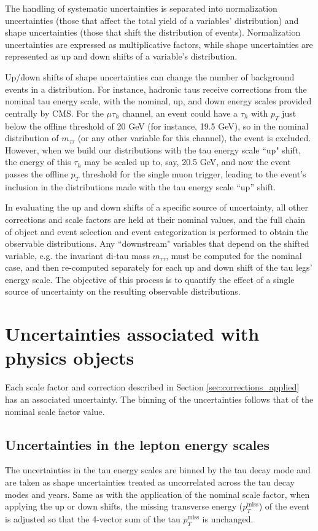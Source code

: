 The handling of systematic uncertainties is separated into normalization uncertainties (those that affect the total yield of a variables' distribution) and shape uncertainties (those that shift the distribution of events). Normalization uncertainties are expressed as multiplicative factors, while shape uncertainties are represented as up and down shifts of a variable's distribution.

Up/down shifts of shape uncertainties can change the number of background events in a distribution. For instance, hadronic taus receive corrections from the nominal tau energy scale, with the nominal, up, and down energy scales provided centrally by CMS. For the $\mu\tau_{h}$ channel, an event could have a $\tau_{h}$ with $p_{T}$ just below the offline threshold of 20 GeV (for instance, 19.5 GeV), so in the nominal distribution of $m_{\tau\tau}$ (or any other variable for this channel), the event is excluded. However, when we build our distributions with the tau energy scale ``up" shift, the energy of this $\tau_{h}$ may be scaled up to, say, 20.5 GeV, and now the event passes the offline $p_{T}$ threshold for the single muon trigger, leading to the event's inclusion in the distributions made with the tau energy scale ``up'' shift.

In evaluating the up and down shifts of a specific source of uncertainty, all other corrections and scale factors are held at their nominal values, and the full chain of object and event selection and event categorization is performed to obtain the observable distributions. Any ``downstream" variables that depend on the shifted variable, e.g. the invariant di-tau mass $m_{\tau\tau}$, must be computed for the nominal case, and then re-computed separately for each up and down shift of the tau legs' energy scale.  The objective of this process is to quantify the effect of a single source of uncertainty on the resulting observable distributions. 


\section{Uncertainties associated with physics objects}
Each scale factor and correction described in Section \ref{sec:corrections_applied} has an associated uncertainty. The binning of the uncertainties follows that of the nominal scale factor value.

\subsection{Uncertainties in the lepton energy scales}
The uncertainties in the tau energy scales \cite{twiki_TAU_POG_tauidrecommendationforrun2} are binned by the tau decay mode and are taken as shape uncertainties treated as uncorrelated across the tau decay modes and years. Same as with the application of the nominal scale factor, when applying the up or down shifts, the missing transverse energy ($p_{T}^{\text{miss}}$) of the event is adjusted so that the 4-vector sum of the tau $p_{T}^{\text{miss}}$ is unchanged.

